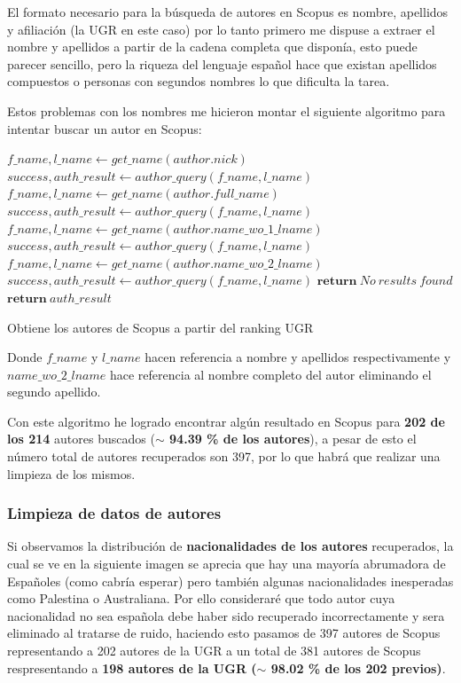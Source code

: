 El formato necesario para la búsqueda de autores en Scopus es nombre, apellidos y afiliación (la \acrshort{UGR} en este caso) por lo tanto primero me dispuse a extraer el nombre y apellidos a partir de la cadena completa que disponía, esto puede parecer sencillo, pero la riqueza del lenguaje español hace que existan apellidos compuestos o personas con segundos nombres lo que dificulta la tarea.

Estos problemas con los nombres me hicieron montar el siguiente algoritmo para intentar buscar un autor en Scopus:


\begin{algorithm}[h]
	\begin{algorithmic} 
		\State $f\_name, l\_name \gets get\_name(author.nick)$
		\State $success, auth\_result  \gets author\_query(f\_name, l\_name)$
		\State $f\_name, l\_name \gets get\_name(author.full\_name)$
		\State $success, auth\_result  \gets author\_query(f\_name, l\_name)$
		\State $f\_name, l\_name \gets get\_name(author.name\_wo\_1\_lname)$
		\State $success, auth\_result  \gets author\_query(f\_name, l\_name)$
		\State $f\_name, l\_name \gets get\_name(author.name\_wo\_2\_lname)$
		\State $success, auth\_result  \gets author\_query(f\_name, l\_name)$
		\State $\textbf{return}\ No\ results\ found$
		\EndIf
		\EndIf
		\EndIf
		\EndIf
		\State $\textbf{return}\ auth\_result$
	
		\EndFor
	\end{algorithmic}  
	\caption{Obtiene los autores de Scopus a partir del ranking UGR}	
\end{algorithm}


Donde $f\_name$ y $l\_name$ hacen referencia a nombre y apellidos respectivamente y $name\_wo\_2\_lname$ hace referencia al nombre completo del autor eliminando el segundo apellido.

Con este algoritmo he logrado encontrar algún resultado en Scopus para \textbf{202 de los 214} autores buscados (\textbf{$\sim$ 94.39 \% de los autores}), a pesar de esto el número total de autores recuperados son 397, por lo que habrá que realizar una limpieza de los mismos.

\subsubsection{Limpieza de datos de autores}
Si observamos la distribución de \textbf{nacionalidades de los autores} recuperados, la cual se ve en la siguiente imagen se aprecia que hay una mayoría abrumadora de Españoles (como cabría esperar) pero también algunas nacionalidades inesperadas como Palestina o Australiana. Por ello consideraré que todo autor cuya nacionalidad no sea española debe haber sido recuperado incorrectamente y sera eliminado al tratarse de ruido, haciendo esto pasamos de 397 autores de Scopus representando a 202 autores de la \acrshort{UGR} a un total de 381 autores de Scopus respresentando a \textbf{198 autores de la \acrshort{UGR} ($\sim$ 98.02 \% de los 202 previos)}.


